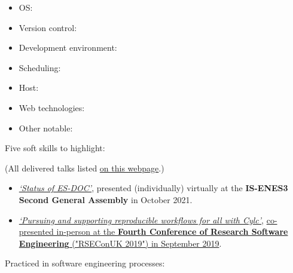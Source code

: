 \documentclass[10pt,a4paper]{cv_template}
\begin{document}
\begin{paracol}{2}
\begin{itemize}
  \item OS:  
  \item Version control:  
  \item Development environment: 
  \item Scheduling:    
  \item Host:   
  \item Web technologies:  
  \item Other notable:   
\end{itemize}



Five soft skills to highlight:
\vspace{0.5ex}



(All delivered talks listed \href{https://github.com/sadielbartholomew/sadielbartholomew/tree/master/talks#readme}{on this webpage}.)
\begin{itemize}
  \item \href{https://github.com/sadielbartholomew/sadielbartholomew/blob/master/talks/is-enes3-ga2-es-doc-status.pdf}{\textit{`Status of ES-DOC'}}, presented (individually) virtually at the \textbf{IS-ENES3 Second General Assembly} in October 2021.
  \item \href{https://metomi.github.io/presentations/RSEConUK2019-Cylc-Talk/#/title-slide}{\textit{`Pursuing and supporting reproducible workflows for all with Cylc'}}, \href{https://rseconuk2019.sched.com/event/QSSI/5d2-hpc-pursuing-and-supporting-reproducible-workflows-for-all-with-cylc}{co-presented in-person at the \textbf{Fourth Conference of Research Software Engineering} ("RSEConUK 2019") in September 2019}.
\end{itemize}



Practiced in software engineering processes:
\vspace{-1.0ex}


\end{paracol}
\end{document}
